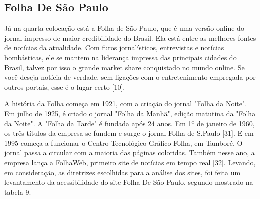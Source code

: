 \documentclass[a4paper]{article}
\begin{document}
\begin{titlepage}
\subsection{Folha De São Paulo}

Já na quarta colocação está a Folha de São Paulo, que é uma versão online do jornal impresso de maior credibilidade do Brasil. Ela está entre as melhores fontes de notícias da atualidade. Com furos jornalísticos, entrevistas e notícias bombásticas, ele se mantem na liderança impressa das principais cidades do Brasil, talvez por isso o grande market share conquistado no mundo online. Se você deseja notícia de verdade, sem ligações com o entretenimento empregada por outros portais, esse é o lugar certo [10].

A história da Folha começa em 1921, com a criação do jornal "Folha da Noite". Em julho de 1925, é criado o jornal "Folha da Manhã", edição matutina da "Folha da Noite". A "Folha da Tarde" é fundada após 24 anos. Em 1º de janeiro de 1960, os três títulos da empresa se fundem e surge o jornal Folha de S.Paulo [31]. E em 1995 começa a funcionar o Centro Tecnológico Gráfico-Folha, em Tamboré. O jornal passa a circular com a maioria das páginas coloridas. Também nesse ano, a empresa lança a FolhaWeb, primeiro site de notícias em tempo real [32]. Levando, em consideração, as diretrizes escolhidas para a análise dos sites, foi feita um levantamento da acessibilidade do site Folha De São Paulo, segundo mostrado na tabela 9.\\


\end{titlepage}
\end{document}
